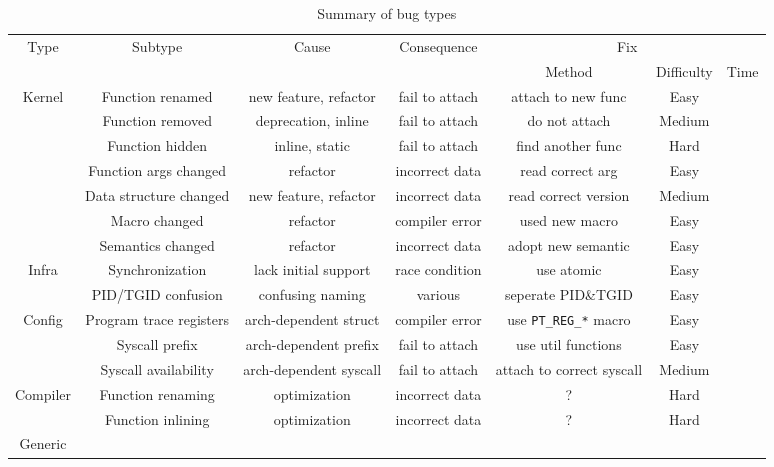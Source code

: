 \begin{table*}
    \centering
    \begin{tabular}{c|c|c|c|c|c|c}
        \multirow{2}{*}{Type} &
        \multirow{2}{*}{Subtype} &
        \multirow{2}{*}{Cause} &
        \multirow{2}{*}{Consequence} &
        \multicolumn{3}{c}{Fix} \\ \cline{5-7}

        & & & & Method & Difficulty & Time \\

        \hline\hline

        \multirow{7}{*}{Kernel}
        & Function renamed & new feature, refactor & fail to attach & attach to new func& Easy & \\ \cline{2-7}
        & Function removed & deprecation, inline & fail to attach & do not attach & Medium & \\ \cline{2-7}
        & Function hidden & inline, static & fail to attach & find another func & Hard & \\ \cline{2-7}
        & Function args changed & refactor & incorrect data & read correct arg & Easy & \\ \cline{2-7}
        & Data structure changed & new feature, refactor & incorrect data & read correct version & Medium & \\ \cline{2-7}
        & Macro changed & refactor & compiler error & used new macro & Easy & \\ \cline{2-7}
        & Semantics changed & refactor & incorrect data & adopt new semantic & Easy & \\

        \hline
        \multirow{2}{*}{Infra} 
        & Synchronization & lack initial support & race condition & use atomic & Easy & \\ \cline{2-7}
        & PID/TGID confusion & confusing naming & various & seperate PID\&TGID & Easy & \\
        \hline
        \multirow{3}{*}{Config} 
        & Program trace registers & arch-dependent struct & compiler error & use \texttt{PT\_REG\_*} macro & Easy & \\ \cline{2-7}
        & Syscall prefix & arch-dependent prefix & fail to attach & use util functions & Easy & \\ \cline{2-7}
        & Syscall availability & arch-dependent syscall &  fail to attach & attach to correct syscall & Medium & \\
        \hline
        \multirow{2}{*}{Compiler} 
        & Function renaming & optimization & incorrect data & ? & Hard & \\ \cline{2-7}
        & Function inlining & optimization & incorrect data & ? & Hard & \\
        \hline
        Generic & & & & & & \\
    \end{tabular}
    \caption{Summary of bug types}
    \label{tab:bug_types}
\end{table*}


